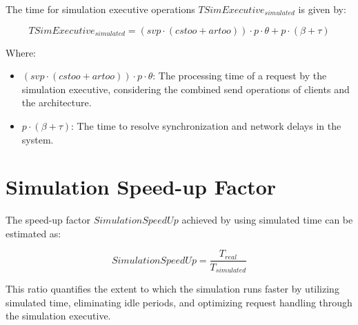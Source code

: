 The time for simulation executive operations \( TSimExecutive_{simulated} \) is given by:

\[
    TSimExecutive_{simulated} = (svp \cdot (cstoo + artoo)) \cdot p \cdot \theta + p \cdot (\beta + \tau)
\]

Where:
\begin{itemize}
    \item \( (svp \cdot (cstoo + artoo)) \cdot p \cdot \theta \): The processing time of a request by the simulation executive, considering the combined send operations of clients and the architecture.
    \item \( p \cdot (\beta + \tau) \): The time to resolve synchronization and network delays in the system.
\end{itemize}

\section{Simulation Speed-up Factor}

The speed-up factor \( SimulationSpeedUp \) achieved by using simulated time can be estimated as:

\[
SimulationSpeedUp = \frac{T_{real}}{T_{simulated}}
\]

This ratio quantifies the extent to which the simulation runs faster by utilizing simulated time, eliminating idle periods, and optimizing request handling through the simulation executive.
